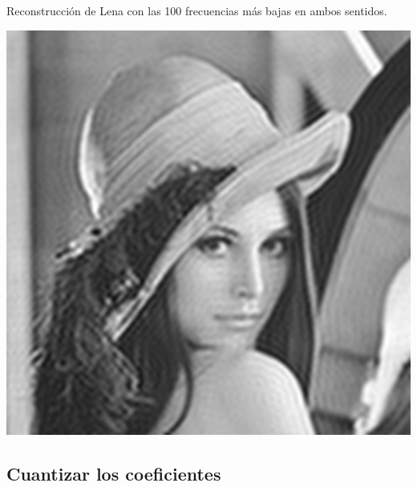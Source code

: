 \documentclass{beamer}
\begin{document}
\begin{frame}
    Reconstrucción de Lena con las 100 frecuencias más bajas en ambos sentidos.
    \begin{center}
        \includegraphics[scale=0.4]{fig/lenas_100frecuencias.png}
    \end{center}
\end{frame}

\subsection{Cuantizar los coeficientes}
\end{document}
